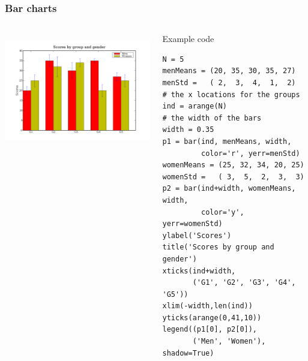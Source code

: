 \documentclass[14pt,compress]{beamer}
\begin{document}
\begin{frame}[fragile] \frametitle{Bar charts}
  \begin{columns}
    \hspace*{-0.5in}
  \includegraphics[height=2in, interpolate=true]{data/barchart}  
    \begin{block}{Example code}
    \tiny
\begin{lstlisting}
N = 5
menMeans = (20, 35, 30, 35, 27)
menStd =   ( 2,  3,  4,  1,  2)
# the x locations for the groups
ind = arange(N) 
# the width of the bars
width = 0.35       
p1 = bar(ind, menMeans, width, 
         color='r', yerr=menStd)
womenMeans = (25, 32, 34, 20, 25)
womenStd =   ( 3,  5,  2,  3,  3)
p2 = bar(ind+width, womenMeans, width, 
         color='y', yerr=womenStd)
ylabel('Scores')
title('Scores by group and gender')
xticks(ind+width, 
       ('G1', 'G2', 'G3', 'G4', 'G5'))
xlim(-width,len(ind))
yticks(arange(0,41,10))
legend((p1[0], p2[0]), 
       ('Men', 'Women'), shadow=True)
\end{lstlisting}
  \end{block}
\end{columns}
\end{frame}
\end{document}
